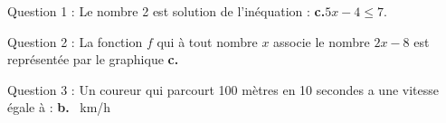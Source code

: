 
\medskip

Question 1 : Le nombre 2 est solution de l'inéquation : \textbf{c.}\quad  $5x - 4 \leqslant  7$.

Question 2 : La fonction $f$ qui à tout nombre $x$ associe le nombre $2 x - 8$ est représentée par le graphique \textbf{c.}

Question 3 : Un coureur qui parcourt 100 mètres en 10 secondes a une vitesse égale à : \textbf{b.} ~km/h

\vspace{0,5cm}

